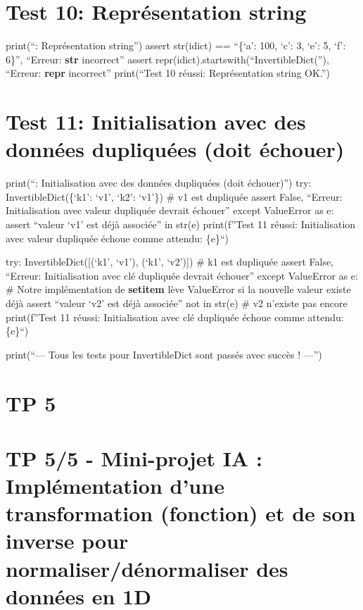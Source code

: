 \documentclass[12pt,a4paper]{report}
\begin{document}
\section{Test 10: Représentation
string}\label{test-10-repruxe9sentation-string}

print(``: Représentation string'') assert str(idict) ==
``\{`a': 100, `c': 3, `e': 5, `f': 6\}'', ``Erreur: \textbf{str}
incorrect'' assert repr(idict).startswith(``InvertibleDict(''),
``Erreur: \textbf{repr} incorrect'' print(``Test 10 réussi:
Représentation string OK.'')

\section{Test 11: Initialisation avec des données dupliquées (doit
échouer)}\label{test-11-initialisation-avec-des-donnuxe9es-dupliquuxe9es-doit-uxe9chouer}

print(``: Initialisation avec des données dupliquées (doit
échouer)'') try: InvertibleDict(\{`k1': `v1', `k2': `v1'\}) \# v1 est
dupliquée assert False, ``Erreur: Initialisation avec valeur dupliquée
devrait échouer'' except ValueError as e: assert ``valeur `v1' est déjà
associée'' in str(e) print(f''Test 11 réussi: Initialisation avec valeur
dupliquée échoue comme attendu: \{e\}``)

try: InvertibleDict({[}(`k1', `v1'), (`k1', `v2'){]}) \# k1 est
dupliquée assert False, ``Erreur: Initialisation avec clé dupliquée
devrait échouer'' except ValueError as e: \# Notre implémentation de
\textbf{setitem} lève ValueError si la nouvelle valeur existe déjà
assert ``valeur `v2' est déjà associée'' not in str(e) \# v2 n'existe
pas encore print(f''Test 11 réussi: Initialisation avec clé dupliquée
échoue comme attendu: \{e\}``)

print(``\n--- Tous les tests pour InvertibleDict sont passés avec succès
! ---'')
\newpage
\section{TP 5}
\section{TP 5/5 - Mini-projet IA : Implémentation d'une transformation
(fonction) et de son inverse pour normaliser/dénormaliser des données en
1D}\label{tp-55---mini-projet-ia-impluxe9mentation-dune-transformation-fonction-et-de-son-inverse-pour-normaliserduxe9normaliser-des-donnuxe9es-en-1d}
\end{document}
